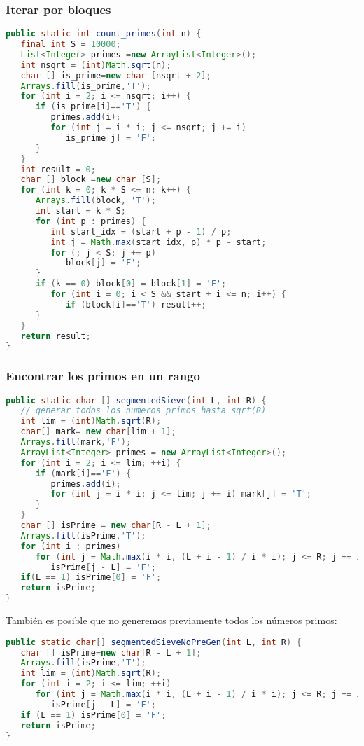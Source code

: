 \subsubsection{Iterar por bloques}
\begin{lstlisting}[language=Java]
public static int count_primes(int n) {
   final int S = 10000;
   List<Integer> primes =new ArrayList<Integer>();
   int nsqrt = (int)Math.sqrt(n);
   char [] is_prime=new char [nsqrt + 2];
   Arrays.fill(is_prime,'T');
   for (int i = 2; i <= nsqrt; i++) {
      if (is_prime[i]=='T') {
         primes.add(i);
         for (int j = i * i; j <= nsqrt; j += i)
            is_prime[j] = 'F';
      }
   }
   int result = 0;
   char [] block =new char [S];
   for (int k = 0; k * S <= n; k++) {
      Arrays.fill(block, 'T');
      int start = k * S;
      for (int p : primes) {
         int start_idx = (start + p - 1) / p;
         int j = Math.max(start_idx, p) * p - start;
         for (; j < S; j += p)
            block[j] = 'F';
      }
      if (k == 0) block[0] = block[1] = 'F';
         for (int i = 0; i < S && start + i <= n; i++) {
            if (block[i]=='T') result++;
      }
   }
   return result;
}
\end{lstlisting}

\subsubsection{Encontrar los primos en un rango}
\begin{lstlisting}[language=Java]
public static char [] segmentedSieve(int L, int R) {
   // generar todos los numeros primos hasta sqrt(R)
   int lim = (int)Math.sqrt(R);
   char[] mark= new char[lim + 1];
   Arrays.fill(mark,'F');
   ArrayList<Integer> primes = new ArrayList<Integer>();
   for (int i = 2; i <= lim; ++i) {
      if (mark[i]=='F') {
         primes.add(i);
         for (int j = i * i; j <= lim; j += i) mark[j] = 'T';
      }
   }
   char [] isPrime = new char[R - L + 1];
   Arrays.fill(isPrime,'T');
   for (int i : primes)
      for (int j = Math.max(i * i, (L + i - 1) / i * i); j <= R; j += i)
         isPrime[j - L] = 'F';
   if(L == 1) isPrime[0] = 'F';
   return isPrime;
}
\end{lstlisting}

También es posible que no generemos previamente todos los números primos:

\begin{lstlisting}[language=Java]
public static char[] segmentedSieveNoPreGen(int L, int R) {
   char [] isPrime=new char[R - L + 1];
   Arrays.fill(isPrime,'T');
   int lim = (int)Math.sqrt(R);
   for (int i = 2; i <= lim; ++i)
      for (int j = Math.max(i * i, (L + i - 1) / i * i); j <= R; j += i) 
         isPrime[j - L] = 'F';
   if (L == 1) isPrime[0] = 'F';
   return isPrime;
}
\end{lstlisting}

